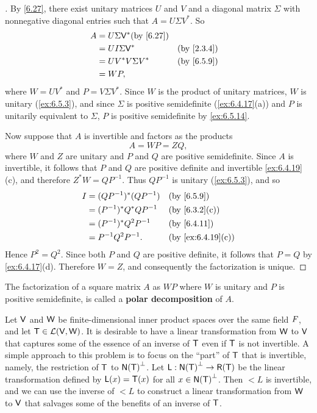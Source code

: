 \begin{proof}[]
  By \cref{6.27}, there exist unitary matrices \(U\) and \(V\) and a diagonal matrix \(\Sigma\) with nonnegative diagonal entries such that \(A = U \Sigma V^*\).
  So
  \begin{align*}
    A & = U \Sigma \V^* \by{6.27}                 \\
      & = U I \Sigma \V^*         &  & \by{2.3.4} \\
      & = U V^* V \Sigma V^*      &  & \by{6.5.9} \\
      & = WP,
  \end{align*}
  where \(W = U V^*\) and \(P = V \Sigma V^*\).
  Since \(W\) is the product of unitary matrices, \(W\) is unitary (\cref{ex:6.5.3}), and since \(\Sigma\) is positive semidefinite (\cref{ex:6.4.17}(a)) and \(P\) is unitarily equivalent to \(\Sigma\), \(P\) is positive semidefinite by \cref{ex:6.5.14}.

  Now suppose that \(A\) is invertible and factors as the products
  \[
    A = WP = ZQ,
  \]
  where \(W\) and \(Z\) are unitary and \(P\) and \(Q\) are positive semidefinite.
  Since \(A\) is invertible, it follows that \(P\) and \(Q\) are positive definite and invertible \cref{ex:6.4.19}(c), and therefore \(Z^* W = Q P^{-1}\).
  Thus \(Q P^{-1}\) is unitary (\cref{ex:6.5.3}), and so
  \begin{align*}
    I & = (Q P^{-1})^* (Q P^{-1}) &  & \by{6.5.9}        \\
      & = (P^{-1})^* Q^* Q P^{-1} &  & \by{6.3.2}[c]     \\
      & = (P^{-1})^* Q^2 P^{-1}   &  & \by{6.4.11}       \\
      & = P^{-1} Q^2 P^{-1}.      &  & \by{ex:6.4.19}[c]
  \end{align*}
  Hence \(P^2 = Q^2\).
  Since both \(P\) and \(Q\) are positive definite, it follows that \(P = Q\) by \cref{ex:6.4.17}(d).
  Therefore \(W = Z\), and consequently the factorization is unique.
\end{proof}

\begin{defn}\label{6.7.4}
  The factorization of a square matrix \(A\) as \(WP\) where \(W\) is unitary and \(P\) is positive semidefinite, is called a \textbf{polar decomposition} of \(A\).
\end{defn}

\begin{prop}\label{6.7.5}
  Let \(\mathsf{V}\) and \(\mathsf{W}\) be finite-dimensional inner product spaces over the same field \(\mathit{F}\), and let \(\mathsf{T} \in \mathcal{L}(\mathsf{V}, \mathsf{W})\).
  It is desirable to have a linear transformation from \(\mathsf{W}\) to \(\mathsf{V}\) that captures some of the essence of an inverse of \(\mathsf{T}\) even if \(\mathsf{T}\) is not invertible.
  A simple approach to this problem is to focus on the ``part'' of \(\mathsf{T}\) that is invertible, namely, the restriction of \(\mathsf{T}\) to \(\ns{\T}^{\perp}\).
  Let \(\lt{L} : \ns{\T}^{\perp} \to \rg{\T}\) be the linear transformation defined by \(\mathsf{L}(x) = \mathsf{T}(x)\) for all \(x \in \ns{\T}^{\perp}\).
  Then \(\lt{L}\) is invertible, and we can use the inverse of \(\lt{L}\) to construct a linear transformation from \(\mathsf{W}\) to \(\mathsf{V}\) that salvages some of the benefits of an inverse of \(\mathsf{T}\).
\end{prop}

